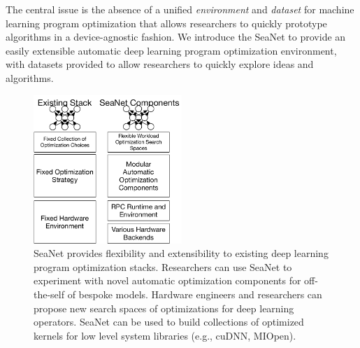 The central issue is the absence of a unified \emph{environment} and \emph{dataset} for machine learning program optimization that allows researchers to quickly prototype algorithms in a device-agnostic fashion.
We introduce the SeaNet to provide an easily extensible automatic deep learning program optimization environment, with datasets provided to allow researchers to quickly explore ideas and algorithms.
\begin{figure}[ht]
\includegraphics[width=0.5\textwidth]{sys_diagrams/overview2.pdf}
\caption{SeaNet provides flexibility and extensibility to existing deep learning program optimization stacks.
Researchers can use SeaNet to experiment with novel automatic optimization components for off-the-self of bespoke models. Hardware engineers and researchers can propose new search spaces of optimizations for deep learning operators. SeaNet can be used to build collections of optimized kernels for low level system libraries (e.g., cuDNN, MIOpen).}
\end{figure}


